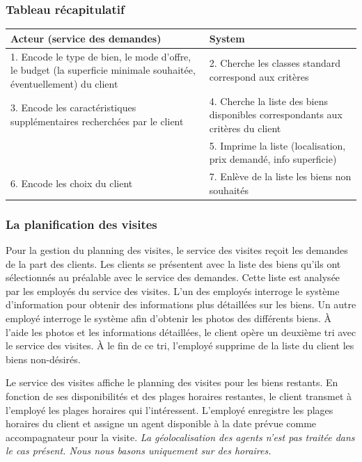 \subsubsection*{Tableau récapitulatif}
\begin{longtable}{|p{7.5cm}|p{7.5cm}|}
\hline
Acteur (service des demandes)& System\\
\hline
1. Encode le type de bien, le mode d'offre, le budget (la superficie minimale souhaitée, éventuellement) du client & 2. Cherche les classes standard correspond aux critères\\
3. Encode les caractéristiques supplémentaires recherchées par le client & 4. Cherche la liste des biens disponibles correspondants aux critères du client\\
& 5. Imprime la liste (localisation, prix demandé, info superficie)\\
6. Encode les choix du client & 7. Enlève de la liste les biens non souhaités\\
\hline
\end{longtable}

\subsubsection{La planification des visites}
Pour la gestion du planning des visites, le service des visites reçoit les demandes de la part des clients.
Les clients se présentent avec la liste des biens qu'ils ont sélectionnés au préalable avec le service des demandes.
Cette liste est analysée par les employés du service des visites. L'un des employés interroge le système d'information pour obtenir des informations plus détaillées sur les biens. Un autre employé interroge le système afin d'obtenir les photos des différents biens.
À l'aide les photos et les informations détaillées, le client opère un deuxième tri avec le service des visites. À le fin de ce tri, l'employé supprime de la liste du client les biens non-désirés.

Le service des visites affiche le planning des visites pour les biens restants.
En fonction de ses disponibilités et des plages horaires restantes, le client transmet à l'employé les plages horaires qui l'intéressent. L'employé enregistre les plages horaires du client et assigne un agent disponible à la date prévue comme accompagnateur pour la visite.
\emph{La géolocalisation des agents n'est pas traitée dans le cas présent. Nous nous basons uniquement sur des horaires.}

